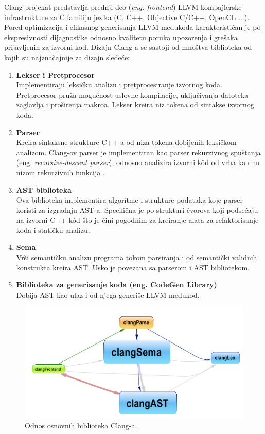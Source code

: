 \documentclass[12pt,oneside]{memoir}
\begin{document}
Clang projekat predstavlja prednji deo (\textit{eng. frontend}) LLVM kompajlerske infrastrukture za C familiju jezika (C, C++, Objective C/C++, OpenCL ...).
Pored optimizacija i efikasnog generisanja LLVM međukoda karakterističan je po ekspresivnosti dijagnostike odnosno kvalitetu poruka upozorenja i grešaka prijavljenih za izvorni kod. Dizajn Clang-a se sastoji od mnoštva biblioteka od kojih su najznačajnije za dizajn sledeće:

\begin{enumerate}
  \item{\textbf{Lekser i Pretprocesor} \\
       Implementiraju leksičku analizu i pretprocesiranje izvornog koda.
       Pretprocesor pru\v{z}a mogućnost uslovne kompilacije, uključivanja datoteka zaglavlja i proširenja makroa.
       Lekser kreira niz tokena od sintakse izvornog koda.}
  \item{\textbf{Parser} \\
        Kreira sintaksne strukture C++-a od niza tokena dobijenih leksičkom analizom.
        Clang-ov parser je implementiran kao parser rekurzivnog spuštanja (eng. \textit{recursive-descent parser}), odnosno analizira izvorni k\^{o}d  od vrha ka dnu nizom rekurzivnih funkcija \cite{LLVMCoreLibraries}.}
  \item{\textbf{AST biblioteka} \\
        Ova biblioteka implementira algoritme i strukture podataka koje parser koristi za izgradnju AST-a. Specifična je po strukturi čvorova koji podsećaju na izvorni C++ k\^{o}d  što je čini pogodnim za kreiranje alata za refaktorisanje koda i statičku analizu.}
  \item{\textbf{Sema} \\
        Vrši semantičku analizu programa tokom parsiranja i od semantički validnih konstrukta kreira AST. Usko je povezana sa parserom i AST bibliotekom.}
  \item{\textbf{Biblioteka za generisanje koda (eng. CodeGen Library)} \\
        Dobija AST kao ulaz i od njega generiše LLVM međukod.}

\end{enumerate}

\begin{figure}[!ht]
  \centering
  \includegraphics[width=1\textwidth]{ClangBiblioteke.png}
  \caption{Odnos osnovnih biblioteka Clang-a.}
  \label{fig:grafikon}
\end{figure}
\end{document}
